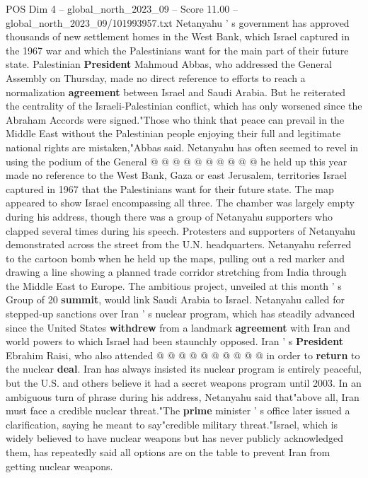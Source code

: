 \begin{textsample}{POS Dim 4 – global\_north\_2023\_09 – Score 11.00 – global\_north\_2023\_09/101993957.txt}
Netanyahu ' s government has approved thousands of new settlement homes in the West Bank, which Israel captured in the 1967 war and which the Palestinians want for the main part of their future state.
Palestinian \textbf{President} Mahmoud Abbas, who addressed the General Assembly on Thursday, made no direct reference to efforts to reach a normalization \textbf{agreement} between Israel and Saudi Arabia.
But he reiterated the centrality of the Israeli-Palestinian conflict, which has only worsened since the Abraham Accords were signed."Those who think that peace can prevail in the Middle East without the Palestinian people enjoying their full and legitimate national rights are mistaken,"Abbas said.
Netanyahu has often seemed to revel in using the podium of the General @ @ @ @ @ @ @ @ @ @ he held up this year made no reference to the West Bank, Gaza or east Jerusalem, territories Israel captured in 1967 that the Palestinians want for their future state.
The map appeared to show Israel encompassing all three.
The chamber was largely empty during his address, though there was a group of Netanyahu supporters who clapped several times during his speech.
Protesters and supporters of Netanyahu demonstrated across the street from the U.N. headquarters.
Netanyahu referred to the cartoon bomb when he held up the maps, pulling out a red marker and drawing a line showing a planned trade corridor stretching from India through the Middle East to Europe.
The ambitious project, unveiled at this month ' s Group of 20 \textbf{summit}, would link Saudi Arabia to Israel.
Netanyahu called for stepped-up sanctions over Iran ' s nuclear program, which has steadily advanced since the United States \textbf{withdrew} from a landmark \textbf{agreement} with Iran and world powers to which Israel had been staunchly opposed.
Iran ' s \textbf{President} Ebrahim Raisi, who also attended @ @ @ @ @ @ @ @ @ @ in order to \textbf{return} to the nuclear \textbf{deal}.
Iran has always insisted its nuclear program is entirely peaceful, but the U.S. and others believe it had a secret weapons program until 2003.
In an ambiguous turn of phrase during his address, Netanyahu said that"above all, Iran must face a credible nuclear threat."The \textbf{prime} minister ' s office later issued a clarification, saying he meant to say"credible military threat."Israel, which is widely believed to have nuclear weapons but has never publicly acknowledged them, has repeatedly said all options are on the table to prevent Iran from getting nuclear weapons.

\end{textsample}
